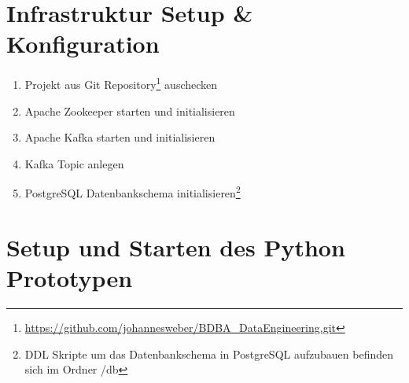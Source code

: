 \section{Infrastruktur Setup \& Konfiguration}
\begin{enumerate}
	\item Projekt aus Git Repository\footnote{\hyperref[hier]{https://github.com/johannesweber/BDBA\_DataEngineering.git}} auschecken
	\item Apache Zookeeper starten und initialisieren
	\item Apache Kafka starten und initialisieren
	\item Kafka Topic anlegen
	\item PostgreSQL Datenbankschema initialisieren\footnote{DDL Skripte um das Datenbankschema in PostgreSQL aufzubauen befinden sich im Ordner /db}
\end{enumerate}

\section{Setup und Starten des Python Prototypen }

